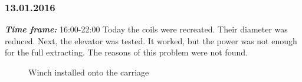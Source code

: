 \subsubsection{13.01.2016}
\textit{\textbf{Time frame:}} 16:00-22:00 \newline
Today the coils were recreated. Their diameter was reduced.
Next, the elevator was tested. It worked, but the power was not enough for the full extracting. The reasons of this problem were not found.

\begin{figure}[H]
	\begin{minipage}[h]{0.58\linewidth}
		\caption{Winch installed onto the carriage}
	\end{minipage}
	\hfill
	\begin{minipage}[h]{0.37\linewidth}

\end{minipage}
\end{figure}
